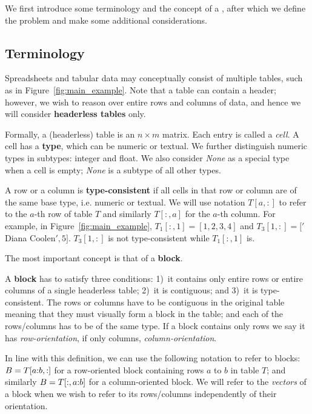 
We first introduce some terminology and the concept of a \template, after which we define the problem and make some additional considerations.

\subsection{Terminology}
Spreadsheets and tabular data may conceptually consist of multiple tables, such as in Figure~\ref{fig:main_example}. Note that a table can contain a header; however, we wish to reason over entire rows and columns of data, and hence we will consider \textbf{headerless tables} only.

Formally, a (headerless) table is an $n \times m$ matrix. Each entry is called a \textit{cell}.
A cell has a {\bf type}, which can be numeric or textual. We further distinguish numeric types in subtypes: integer and float. We also consider \textit{None} as a special type when a cell is empty; \textit{None} is a subtype of all other types.

A row or a column is \textbf{type-consistent} if all cells in that row or column are of the same base type, i.e. numeric or textual.
We will use notation $T[a,{:}]$ to refer to the $a$-th row of table $T$ and similarly $T[{:},a]$ for the $a$-th column.
For example, in Figure~\ref{fig:main_example}, $T_1[:,1] = [1,2,3,4]$ and $T_3[1,:] = ['$Diana Coolen$', 5]$.
$T_3[1, :]$ is not type-consistent while $T_1[:, 1]$ is.

The most important concept is that of a \textbf{block}. 
\begin{definition}
A \textbf{block} has to satisfy three conditions: 1)~it contains only entire rows or entire columns of a single headerless table; 2)~it is contiguous; and 3)~it is type-consistent.
The rows or columns have to be contiguous in the original table meaning that they must visually form a block in the table; and each of the rows/columns has to be of the same type. 
If a block contains only rows we say it has \textit{row-orientation}, if only columns, \textit{column-orientation}. 
\end{definition}

In line with this definition, we can use the following notation to refer to blocks: $B = T[a{:}b,:]$ for a row-oriented block containing rows $a$ to $b$ in table $T$; and similarly $B = T[{:},a{:}b]$ for a column-oriented block.
We will refer to the \textit{vectors} of a block when we wish to refer to its rows/columns independently of their orientation.


